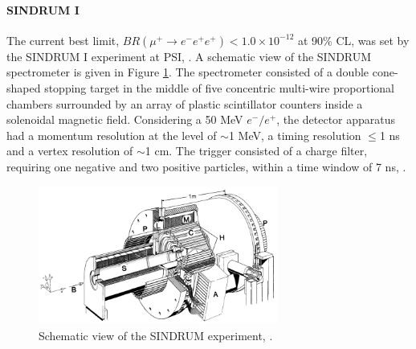 \paragraph{SINDRUM I}
The current best limit, $BR(\mu^+ \rightarrow e^- e^+ e^+) < 1.0 \times 10^{- 12}$ at 90\% CL, was set by the
SINDRUM I experiment at PSI, \cite{sindrumi}. A schematic view of the SINDRUM spectrometer is given in Figure \ref{fig:sindrumi}. 
The spectrometer consisted of a double cone-shaped stopping target in the middle of five concentric multi-wire proportional chambers surrounded by an array of plastic
scintillator counters inside a solenoidal magnetic field. Considering a 50 MeV $e^-/e^+$, the detector 
apparatus had a momentum resolution at the level of $\sim$1 MeV,
a timing resolution $\leq$1 ns and a vertex resolution of $\sim$1 cm. 
The trigger consisted of a charge filter, requiring one negative and two 
positive particles, within a time window of 7 ns, \cite{universe8060299}.
\begin{figure}[!h]
\centering
\includegraphics[width =0.7\textwidth]{figures/png/The-SINDRUM-I-detector-in-the-horizontal-operating-orientation.png}
\caption[SINDRUM experiment.]{Schematic view of the SINDRUM experiment, \cite{sindrumi}.}
\label{fig:sindrumi}
\end{figure}

